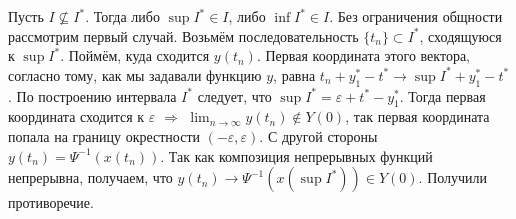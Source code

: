 \begin{enumerate}
    Пусть $I \nsubseteq I^*$. Тогда либо $\sup I^* \in I$, либо $\inf I^* \in I$. Без ограничения общности рассмотрим первый случай. Возьмём последовательность $\{t_n\} \subset I^*$, сходящуюся к $\sup I^*$. Поймём, куда сходится $y(t_n)$. Первая координата этого вектора, согласно тому, как мы задавали функцию $y$, равна $t_n + y_1^* - t^* \to \sup I^* + y_1^* - t^*$. По построению интервала $I^*$ следует, что $\sup I^* = \varepsilon + t^* - y_1^*$. Тогда первая координата сходится к $\varepsilon$ $\Rightarrow$ $\lim_{n\to\infty}y(t_n) \notin Y(0)$, так первая координата попала на границу окрестности $(-\varepsilon, \varepsilon)$.
    С другой стороны $y(t_n) = \Psi^{-1}(x(t_n))$. Так как композиция непрерывных функций непрерывна, получаем, что $y(t_n) \to \Psi^{-1}(x(\sup I^*)) \in Y(0)$. Получили противоречие.
\end{enumerate}

\QED









